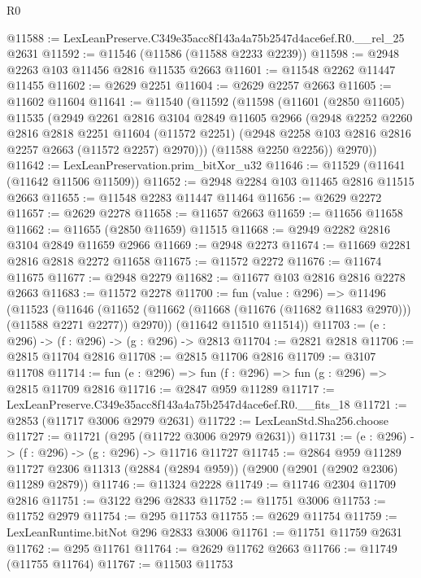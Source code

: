 \begin{lexlean}{R0}
\begin{coremodule}
@11588 := LexLeanPreserve.C349e35acc8f143a4a75b2547d4ace6ef.R0.__rel_25 @2631
@11592 := @11546 (@11586 (@11588 @2233 @2239))
@11598 := @2948 @2263 @103 @11456 @2816 @11535 @2663
@11601 := @11548 @2262 @11447 @11455
@11602 := @2629 @2251
@11604 := @2629 @2257 @2663
@11605 := @11602 @11604
@11641 := @11540
    (@11592
      (@11598
        (@11601
          (@2850 @11605)
          @11535
          (@2949
            @2261
            @2816
            @3104
            @2849
            @11605
            @2966
            (@2948
              @2252
              @2260
              @2816
              @2818
              @2251
              @11604
              (@11572 @2251)
              (@2948 @2258 @103 @2816 @2816 @2257 @2663 (@11572 @2257) @2970)))
          (@11588 @2250 @2256))
        @2970))
@11642 := LexLeanPreservation.prim_bitXor_u32
@11646 := @11529 (@11641 (@11642 @11506 @11509))
@11652 := @2948 @2284 @103 @11465 @2816 @11515 @2663
@11655 := @11548 @2283 @11447 @11464
@11656 := @2629 @2272
@11657 := @2629 @2278
@11658 := @11657 @2663
@11659 := @11656 @11658
@11662 := @11655 (@2850 @11659) @11515
@11668 := @2949 @2282 @2816 @3104 @2849 @11659 @2966
@11669 := @2948 @2273
@11674 := @11669 @2281 @2816 @2818 @2272 @11658
@11675 := @11572 @2272
@11676 := @11674 @11675
@11677 := @2948 @2279
@11682 := @11677 @103 @2816 @2816 @2278 @2663
@11683 := @11572 @2278
@11700 := fun (value : @296) =>
  @11496
    (@11523
      (@11646 (@11652 (@11662 (@11668 (@11676 (@11682 @11683 @2970))) (@11588 @2271 @2277)) @2970))
      (@11642 @11510 @11514))
@11703 := (e : @296) -> (f : @296) -> (g : @296) -> @2813
@11704 := @2821 @2818
@11706 := @2815 @11704 @2816
@11708 := @2815 @11706 @2816
@11709 := @3107 @11708
@11714 := fun (e : @296) => fun (f : @296) => fun (g : @296) => @2815 @11709 @2816
@11716 := @2847 @959 @11289
@11717 := LexLeanPreserve.C349e35acc8f143a4a75b2547d4ace6ef.R0.__fits_18
@11721 := @2853 (@11717 @3006 @2979 @2631)
@11722 := LexLeanStd.Sha256.choose
@11727 := @11721 (@295 (@11722 @3006 @2979 @2631))
@11731 := (e : @296) -> (f : @296) -> (g : @296) -> @11716 @11727
@11745 := @2864
    @959
    @11289
    @11727
    @2306
    @11313
    (@2884 (@2894 @959))
    (@2900 (@2901 (@2902 @2306) @11289 @2879))
@11746 := @11324 @2228
@11749 := @11746 @2304 @11709 @2816
@11751 := @3122 @296 @2833
@11752 := @11751 @3006
@11753 := @11752 @2979
@11754 := @295 @11753
@11755 := @2629 @11754
@11759 := LexLeanRuntime.bitNot @296 @2833 @3006
@11761 := @11751 @11759 @2631
@11762 := @295 @11761
@11764 := @2629 @11762 @2663
@11766 := @11749 (@11755 @11764)
@11767 := @11503 @11753

\end{coremodule}
\end{lexlean}
